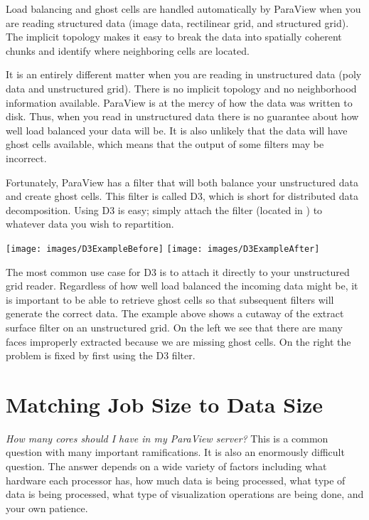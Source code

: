 Load balancing and ghost cells are handled automatically by ParaView when
you are reading structured data (image data, rectilinear grid, and
structured grid).  The implicit topology makes it easy to break the data
into spatially coherent chunks and identify where neighboring cells are
located.

It is an entirely different matter when you are reading in unstructured
data (poly data and unstructured grid).  There is no implicit topology and
no neighborhood information available.  ParaView is at the mercy of how the
data was written to disk.  Thus, when you read in unstructured data there
is no guarantee about how well load balanced your data will be.  It is also
unlikely that the data will have ghost cells available, which means that
the output of some filters may be incorrect.

Fortunately, ParaView has a filter that will both balance your unstructured
data and create ghost cells.  This filter is called D3, which is short for
distributed data decomposition.  Using D3 is easy; simply attach the filter
(located in  \ra {} \ra {}) to whatever
data you wish to repartition.

\begin{inlinefig}
  \texttt{[image: images/D3ExampleBefore]}
  \texttt{[image: images/D3ExampleAfter]}
\end{inlinefig}

The most common use case for D3 is to attach it directly to your
unstructured grid reader.  Regardless of how well load balanced the incoming
data might be, it is important to be able to retrieve ghost cells so that
subsequent filters will generate the correct data.  The example above shows
a cutaway of the extract surface filter on an unstructured grid.  On the
left we see that there are many faces improperly extracted because we are
missing ghost cells.  On the right the problem is fixed by first using the
D3 filter.


\section{Matching Job Size to Data Size}

\emph{How many cores should I have in my ParaView server?}  This is a
common question with many important ramifications.  It is also an
enormously difficult question.  The answer depends on a wide variety of
factors including what hardware each processor has, how much data is being
processed, what type of data is being processed, what type of visualization
operations are being done, and your own patience.

